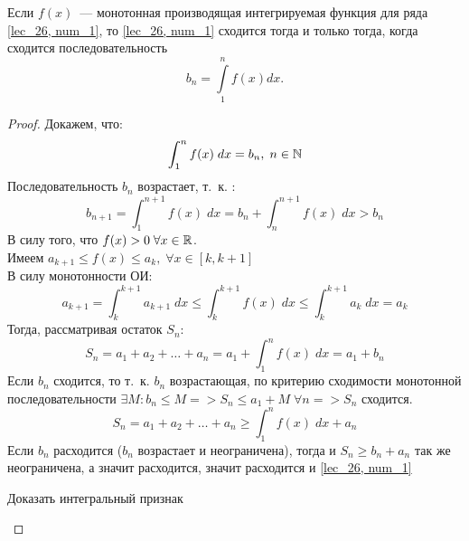 \documentclass[../../main.tex]{subfiles}
\begin{document}
	\begin{thm} \label{lec27,integral_att}
		Если $f(x)$~--- монотонная производящая интегрируемая функция для ряда \eqref{lec_26, num_1}, то \eqref{lec_26, num_1} сходится тогда и только тогда, когда сходится последовательность \[b_n = \int\limits_1^n f(x)dx.\]
		\begin{proof}
			Докажем, что:
			\[ \int_{1}^{n} f(x) \; dx = b_n , \; n \in \mathbb{N}  \]
			Последовательность $b_n$ возрастает, т.~к. :
			\[ b_{n+1} = \int_{1}^{n+1} f(x) \; dx  = b_n + \int_{n}^{n+1} f(x) \; dx > 
			b_n \]
			В силу того, что $f(x) > 0 \; \forall x \in \mathbb{R}$.\\			
			Имеем $a_{k+1} \le f(x) \le a_k, \; \forall x \in [k,k+1]$\\		
			В силу монотонности ОИ:
			\[ a_{k+1} = \int_{k}^{k+1}a_{k+1} \; dx  \le \int_{k}^{k+1}f(x) \; dx \le 
			\int_{k}^{k+1}a_{k} \; dx  = a_{k}   \]
			Тогда, рассматривая остаток $S_n$:
			\[ S_n = a_1 + a_2 + \dots + a_n = a_1 +  \int_{1}^{n}f(x) \; dx  = a_1 + 
			b_n \]
			Если $b_n$ сходится, то т.~к. $b_n$ возрастающая, по критерию сходимости 
			монотонной последовательности $\exists M : b_n \le M => S_n \le a_1 + M \;  
			\forall n => S_n$ сходится.
			\[ S_n = a_1 + a_2 + \dots + a_n \ge \int_{1}^{n}f(x) \; dx  + a_n   \]
			Если $b_n$ расходится ($b_n$  возрастает и неограничена), тогда и $S_n \ge 
			b_n + a_n$ так же неограничена, а значит расходится, значит расходится и 
			\ref{lec_26, num_1}
			\begin{exc}
				Доказать интегральный признак
			\end{exc}	
		\end{proof}
	\end{thm}
\end{document}
